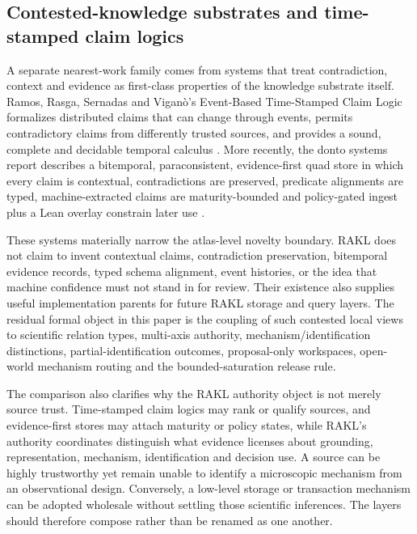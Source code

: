 \subsection{Contested-knowledge substrates and time-stamped claim logics}

A separate nearest-work family comes from systems that treat contradiction, context and evidence as first-class properties of the knowledge substrate itself. Ramos, Rasga, Sernadas and Vigan\`o's Event-Based Time-Stamped Claim Logic formalizes distributed claims that can change through events, permits contradictory claims from differently trusted sources, and provides a sound, complete and decidable temporal calculus \cite{ramos2021eventclaim}. More recently, the donto systems report describes a bitemporal, paraconsistent, evidence-first quad store in which every claim is contextual, contradictions are preserved, predicate alignments are typed, machine-extracted claims are maturity-bounded and policy-gated ingest plus a Lean overlay constrain later use \cite{donto2026}.

These systems materially narrow the atlas-level novelty boundary. RAKL does not claim to invent contextual claims, contradiction preservation, bitemporal evidence records, typed schema alignment, event histories, or the idea that machine confidence must not stand in for review. Their existence also supplies useful implementation parents for future RAKL storage and query layers. The residual formal object in this paper is the coupling of such contested local views to scientific relation types, multi-axis authority, mechanism/identification distinctions, partial-identification outcomes, proposal-only workspaces, open-world mechanism routing and the bounded-saturation release rule.

The comparison also clarifies why the RAKL authority object is not merely source trust. Time-stamped claim logics may rank or qualify sources, and evidence-first stores may attach maturity or policy states, while RAKL's authority coordinates distinguish what evidence licenses about grounding, representation, mechanism, identification and decision use. A source can be highly trustworthy yet remain unable to identify a microscopic mechanism from an observational design. Conversely, a low-level storage or transaction mechanism can be adopted wholesale without settling those scientific inferences. The layers should therefore compose rather than be renamed as one another.
